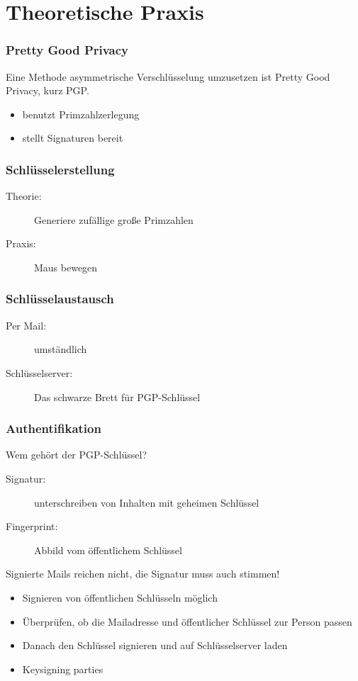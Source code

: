 \documentclass[compress]{beamer}
\begin{document}
\section{Theoretische Praxis}
\label{sec-1-1-4}

\begin{frame}
    \frametitle{Pretty Good Privacy}
    Eine Methode asymmetrische Verschlüsselung umzusetzen ist
    \alert{P}retty \alert{G}ood \alert{P}rivacy, kurz PGP.
    \begin{itemize}
        \item benutzt Primzahlzerlegung
        \item stellt Signaturen bereit
    \end{itemize}
\end{frame}
\begin{frame}
    \frametitle{Schlüsselerstellung}
    \begin{description}
        \item[Theorie:] Generiere zufällige große Primzahlen
        \item[Praxis:] Maus bewegen
    \end{description}
\end{frame}
\begin{frame}
    \frametitle{Schlüsselaustausch}
    \begin{description}
        \item[Per Mail:] umständlich
        \item[Schlüsselserver:] Das schwarze Brett für PGP-Schlüssel
    \end{description}
\end{frame}
\begin{frame}
    \frametitle{Authentifikation}
    Wem gehört der PGP-Schlüssel?
    \begin{description}
        \item[Signatur:] unterschreiben von Inhalten mit geheimen Schlüssel
        \item[Fingerprint:] Abbild vom öffentlichem Schlüssel
    \end{description}
    Signierte Mails reichen nicht, die Signatur muss auch stimmen!
    \begin{itemize}
        \item Signieren von öffentlichen Schlüsseln möglich
        \item Überprüfen, ob die Mailadresse und öffentlicher Schlüssel zur Person passen
        \item Danach den Schlüssel signieren und auf Schlüsselserver laden
        \item Keysigning parties
    \end{itemize}
\end{frame}
\end{document}
